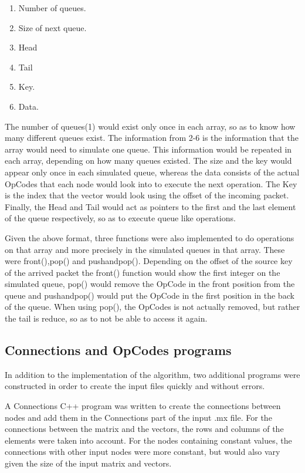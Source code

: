 \documentclass[12pt,a4paper]{article}
\begin{document}
\begin{enumerate}
\item Number of queues.
\item Size of next queue.
\item Head
\item Tail
\item Key.
\item Data.
\end{enumerate}
The number of queues(1) would exist only once in each array, so as to know how many different queues exist. The information from 2-6 is the information that the array would need to simulate one queue. This information would be repeated in each array, depending on how many queues existed. The size and the key would appear only once in each simulated queue, whereas the data consists of the actual OpCodes that each node would look into to execute the next operation. The Key is the index that the vector would look using the offset of the incoming packet. Finally, the Head and Tail would act as pointers to the first and the last element of the queue respectively, so as to execute queue like operations.

Given the above format, three functions were also implemented to do operations on that array and more precisely in the simulated queues in that array. These were front(),pop() and pushandpop(). Depending on the offset of the source key of the arrived packet the front() function would show the first integer on the simulated queue, pop() would remove the OpCode in the front position from the queue and pushandpop() would put the OpCode in the first position in the back of the queue. When using pop(), the OpCodes is not actually removed, but rather the tail is reduce, so as to not be able to access it again.
\subsection{Connections and OpCodes programs}
In addition to the implementation of the algorithm, two additional programs were constructed in order to create the input files quickly and without errors. 

A Connections C++ program was written to create the connections between nodes and add them in the Connections part of the input .mx file. For the connections between the matrix and the vectors, the rows and columns of the elements were taken into account. For the nodes containing constant values, the connections with other input nodes were more constant, but would also vary given the size of the input matrix and vectors. 
\end{document}
